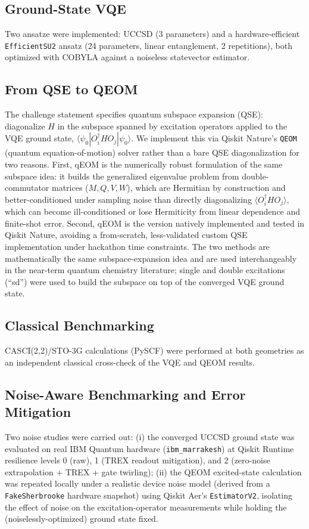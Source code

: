 \documentclass[10pt]{article}
\begin{document}
\subsection{Ground-State VQE}
Two ansatze were implemented: UCCSD (3 parameters) and a hardware-efficient
\texttt{EfficientSU2} ansatz (24 parameters, linear entanglement, 2
repetitions), both optimized with COBYLA against a noiseless statevector
estimator.

\subsection{From QSE to QEOM}
The challenge statement specifies quantum subspace expansion (QSE): diagonalize
$H$ in the subspace spanned by excitation operators applied to the VQE ground
state, $\langle\psi_0|O_i^\dagger H O_j|\psi_0\rangle$. We implement this via
Qiskit Nature's \texttt{QEOM} (quantum equation-of-motion) solver rather than
a bare QSE diagonalization for two reasons. First, qEOM is the numerically
robust formulation of the same subspace idea: it builds the generalized
eigenvalue problem from double-commutator matrices ($M,Q,V,W$), which are
Hermitian by construction and better-conditioned under sampling noise than
directly diagonalizing $\langle O_i^\dagger H O_j\rangle$, which can become
ill-conditioned or lose Hermiticity from linear dependence and finite-shot
error. Second, qEOM is the version natively implemented and tested in Qiskit
Nature, avoiding a from-scratch, less-validated custom QSE implementation
under hackathon time constraints. The two methods are mathematically the same
subspace-expansion idea and are used interchangeably in the near-term quantum
chemistry literature; single and double excitations (``sd'') were used to
build the subspace on top of the converged VQE ground state.

\subsection{Classical Benchmarking}
CASCI(2,2)/STO-3G calculations (PySCF) were performed at both geometries as
an independent classical cross-check of the VQE and QEOM results.

\subsection{Noise-Aware Benchmarking and Error Mitigation}
Two noise studies were carried out: (i) the converged UCCSD ground state was
evaluated on real IBM Quantum hardware (\texttt{ibm\_marrakesh}) at
Qiskit Runtime resilience levels 0 (raw), 1 (TREX readout mitigation), and 2
(zero-noise extrapolation + TREX + gate twirling); (ii) the QEOM excited-state
calculation was repeated locally under a realistic device noise model
(derived from a \texttt{FakeSherbrooke} hardware snapshot) using Qiskit Aer's
\texttt{EstimatorV2}, isolating the effect of noise on the excitation-operator
measurements while holding the (noiselessly-optimized) ground state fixed.
\end{document}
